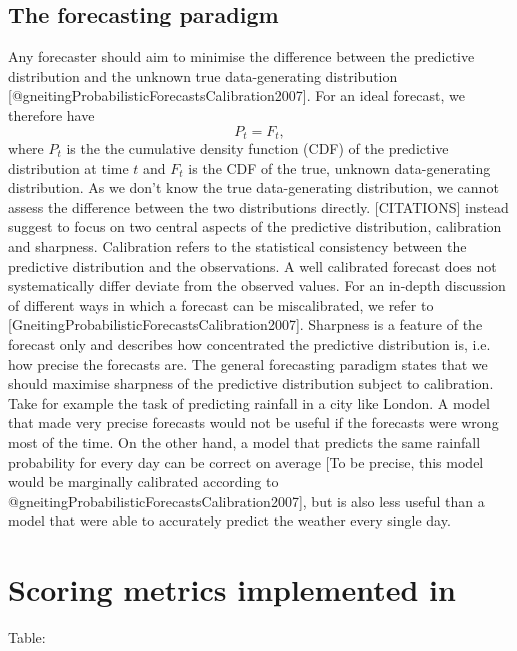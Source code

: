 \documentclass[article]{jss}
\begin{document}
\subsection{The forecasting paradigm}

Any forecaster should aim to minimise the difference between the predictive distribution and the unknown true data-generating distribution [@gneitingProbabilisticForecastsCalibration2007]. For an ideal forecast, we therefore have 
%
$$ P_t = F_t, $$
%
where $P_t$ is the the cumulative density function (CDF) of the predictive distribution at time $t$ and $F_t$ is the CDF of the true, unknown data-generating distribution. As we don't know the true data-generating distribution, we cannot assess the difference between the two distributions directly. [CITATIONS] instead suggest to focus on two central aspects of the predictive distribution, calibration and sharpness. Calibration refers to the statistical consistency between the predictive distribution and the observations. A well calibrated forecast does not systematically differ deviate from the observed values. For an in-depth discussion of different ways in which a forecast can be miscalibrated, we refer to [GneitingProbabilisticForecastsCalibration2007]. Sharpness is a feature of the forecast only and describes how concentrated the predictive distribution is, i.e. how precise the forecasts are. The general forecasting paradigm states that we should maximise sharpness of the predictive distribution subject to calibration. Take for example the task of predicting rainfall in a city like London. A model that made very precise forecasts would not be useful if the forecasts were wrong most of the time. On the other hand, a model that predicts the same rainfall probability for every day can be correct on average [To be precise, this model would be marginally calibrated according to @gneitingProbabilisticForecastsCalibration2007], but is also less useful than a model that were able to accurately predict the weather every single day. %


\section[metrics]{Scoring metrics implemented in }

Table: 
\end{document}
